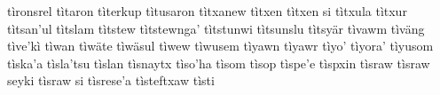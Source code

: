 tìronsrel\hspace{2mm}
tìtaron\hspace{2mm}
tìterkup\hspace{2mm}
tìtusaron\hspace{2mm}
tìtxanew\hspace{2mm}
tìtxen\hspace{2mm}
tìtxen si\hspace{2mm}
tìtxula\hspace{2mm}
tìtxur\hspace{2mm}
tìtsan'ul\hspace{2mm}
tìtslam\hspace{2mm}
tìtstew\hspace{2mm}
tìtstewnga'\hspace{2mm}
tìtstunwi\hspace{2mm}
tìtsunslu\hspace{2mm}
tìtsyär\hspace{2mm}
tìvawm\hspace{2mm}
tìväng\hspace{2mm}
tìve'kì\hspace{2mm}
tìwan\hspace{2mm}
tìwäte\hspace{2mm}
tìwäsul\hspace{2mm}
tìwew\hspace{2mm}
tìwusem\hspace{2mm}
tìyawn\hspace{2mm}
tìyawr\hspace{2mm}
tìyo'\hspace{2mm}
tìyora'\hspace{2mm}
tìyusom\hspace{2mm}
tìska'a\hspace{2mm}
tìsla'tsu\hspace{2mm}
tìslan\hspace{2mm}
tìsnaytx\hspace{2mm}
tìso'ha\hspace{2mm}
tìsom\hspace{2mm}
tìsop\hspace{2mm}
tìspe'e\hspace{2mm}
tìspxin\hspace{2mm}
tìsraw\hspace{2mm}
tìsraw seyki\hspace{2mm}
tìsraw si\hspace{2mm}
tìsrese'a\hspace{2mm}
tìsteftxaw\hspace{2mm}
tìsti\hspace{2mm}
